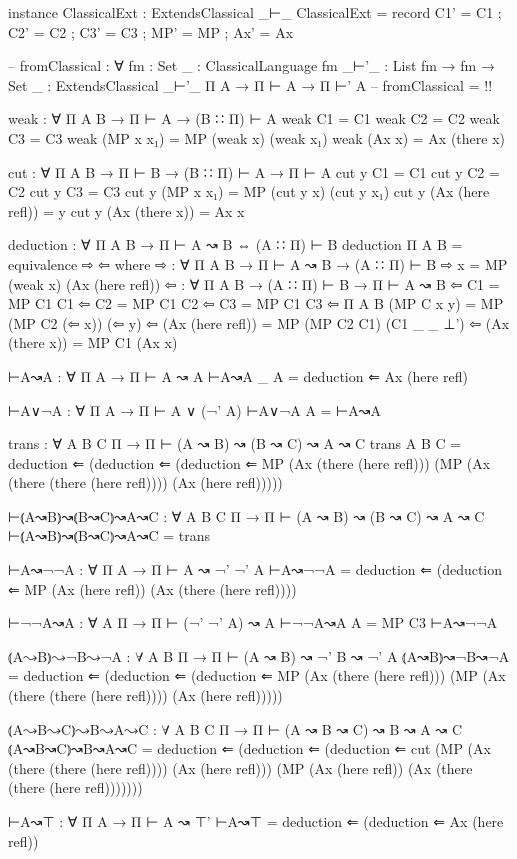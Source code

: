 \begin{spverbatim}
instance
  ClassicalExt : ExtendsClassical _⊢_
  ClassicalExt = record { C1' = C1 ; C2' = C2 ; C3' = C3 ; MP' = MP ; Ax' = Ax }

-- fromClassical : ∀ {fm : Set} {{_ : ClassicalLanguage fm}} {_⊢'_ : List fm → fm → Set} {{_ : ExtendsClassical _⊢'_}} {Π A} → Π ⊢ A → Π ⊢' A
-- fromClassical = {!!}

weak : ∀ {Π A B} → Π ⊢ A → (B ∷ Π) ⊢ A
weak C1 = C1
weak C2 = C2
weak C3 = C3
weak (MP x x₁) = MP (weak x) (weak x₁)
weak (Ax x) = Ax (there x)

cut : ∀ {Π A B} → Π ⊢ B → (B ∷ Π) ⊢ A → Π ⊢ A
cut y C1 = C1
cut y C2 = C2
cut y C3 = C3
cut y (MP x x₁) = MP (cut y x) (cut y x₁)
cut y (Ax (here refl)) = y
cut y (Ax (there x)) = Ax x

deduction : ∀ {Π A B} → Π ⊢ A ↝ B ⇔ (A ∷ Π) ⊢ B
deduction {Π} {A} {B} = equivalence ⇨ ⇦
  where
  ⇨ : ∀ {Π A B} → Π ⊢ A ↝ B → (A ∷ Π) ⊢ B
  ⇨ x = MP (weak x) (Ax (here refl))
  ⇦ : ∀ {Π A B} → (A ∷ Π) ⊢ B → Π ⊢ A ↝ B
  ⇦ C1 = MP C1 C1
  ⇦ C2 = MP C1 C2
  ⇦ C3 = MP C1 C3
  ⇦ {Π} {A} {B} (MP {C} x y) = MP (MP C2 (⇦ x)) (⇦ y)
  ⇦ (Ax (here refl)) = MP (MP C2 C1) (C1 {_} {_} {⊥'})
  ⇦ (Ax (there x)) = MP C1 (Ax x)

⊢A↝A : ∀ {Π A} → Π ⊢ A ↝ A
⊢A↝A {_} {A} = deduction ⇐ Ax (here refl)

⊢A∨¬A : ∀ {Π A} → Π ⊢ A ∨ (¬' A)
⊢A∨¬A {A} = ⊢A↝A

trans : ∀ {A B C Π} → Π ⊢ (A ↝ B) ↝ (B ↝ C) ↝ A ↝ C
trans {A} {B} {C} = deduction ⇐ (deduction ⇐ (deduction ⇐ MP (Ax (there (here refl)))
  (MP (Ax (there (there (here refl)))) (Ax (here refl)))))

⊢⦅A↝B⦆↝⦅B↝C⦆↝A↝C : ∀ {A B C Π} → Π ⊢ (A ↝ B) ↝ (B ↝ C) ↝ A ↝ C
⊢⦅A↝B⦆↝⦅B↝C⦆↝A↝C = trans

⊢A↝¬¬A : ∀ {Π A} → Π ⊢ A ↝ ¬' ¬' A
⊢A↝¬¬A = deduction ⇐ (deduction ⇐ MP (Ax (here refl)) (Ax (there (here refl))))

⊢¬¬A↝A : ∀ {A Π} → Π ⊢ (¬' ¬' A) ↝ A
⊢¬¬A↝A {A} = MP C3 ⊢A↝¬¬A

⦅A↝B⦆↝¬B↝¬A : ∀ {A B Π} → Π ⊢ (A ↝ B) ↝ ¬' B ↝ ¬' A
⦅A↝B⦆↝¬B↝¬A = deduction ⇐ (deduction ⇐ (deduction ⇐ MP (Ax (there (here refl)))
  (MP (Ax (there (there (here refl)))) (Ax (here refl)))))

⦅A↝B↝C⦆↝B↝A↝C : ∀ {A B C Π} → Π ⊢ (A ↝ B ↝ C) ↝ B ↝ A ↝ C
⦅A↝B↝C⦆↝B↝A↝C = deduction ⇐ (deduction ⇐ (deduction ⇐ cut
  (MP (Ax (there (there (here refl)))) (Ax (here refl))) (MP (Ax (here refl))
  (Ax (there (there (here refl)))))))

⊢A↝⊤ : ∀ {Π A} → Π ⊢ A ↝ ⊤'
⊢A↝⊤ = deduction ⇐ (deduction ⇐ Ax (here refl))


\end{spverbatim}
